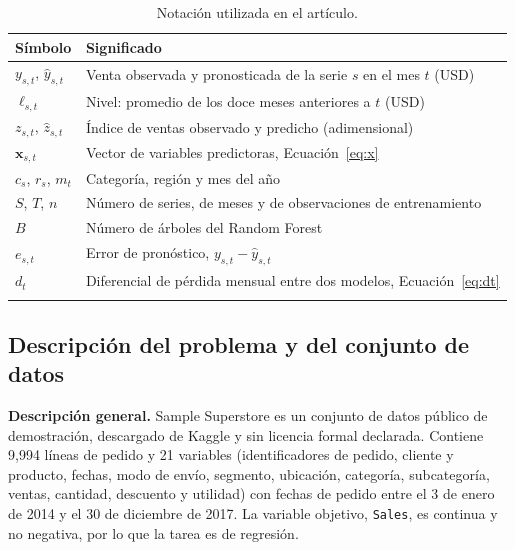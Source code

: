 \documentclass[pdflatex,sn-mathphys-num]{sn-jnl}
\begin{document}
\begin{table}[!htb]
\caption{Notación utilizada en el artículo.}\label{tab:notacion}
\begin{tabular}{@{}ll@{}}
\toprule
Símbolo & Significado \\
\midrule
$y_{s,t}$, $\hat{y}_{s,t}$ & Venta observada y pronosticada de la serie $s$ en el mes $t$ (USD) \\
$\ell_{s,t}$ & Nivel: promedio de los doce meses anteriores a $t$ (USD) \\
$z_{s,t}$, $\hat{z}_{s,t}$ & Índice de ventas observado y predicho (adimensional) \\
$\mathbf{x}_{s,t}$ & Vector de variables predictoras, Ecuación~\eqref{eq:x} \\
$c_s$, $r_s$, $m_t$ & Categoría, región y mes del año \\
$S$, $T$, $n$ & Número de series, de meses y de observaciones de entrenamiento \\
$B$ & Número de árboles del Random Forest \\
$e_{s,t}$ & Error de pronóstico, $y_{s,t}-\hat{y}_{s,t}$ \\
$d_t$ & Diferencial de pérdida mensual entre dos modelos, Ecuación~\eqref{eq:dt} \\
\botrule
\end{tabular}
\end{table}

\subsection{Descripción del problema y del conjunto de datos}\label{subsec:datos}

\textbf{Descripción general.} Sample Superstore \cite{superstore} es un conjunto de datos público de demostración, descargado de Kaggle y sin licencia formal declarada. Contiene 9{,}994 líneas de pedido y 21 variables (identificadores de pedido, cliente y producto, fechas, modo de envío, segmento, ubicación, categoría, subcategoría, ventas, cantidad, descuento y utilidad) con fechas de pedido entre el 3 de enero de 2014 y el 30 de diciembre de 2017. La variable objetivo, \texttt{Sales}, es continua y no negativa, por lo que la tarea es de regresión.
\end{document}
